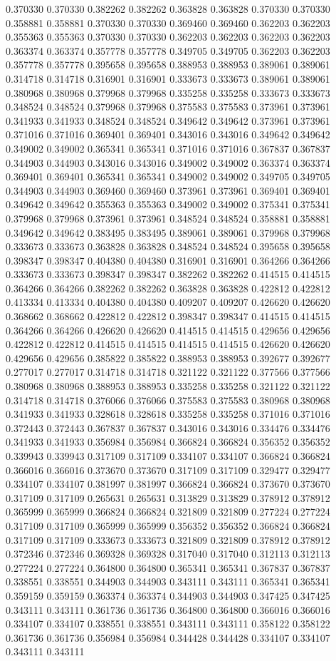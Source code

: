 0.370330 0.370330 0.382262 0.382262 0.363828 0.363828 0.370330 0.370330 0.358881 0.358881 0.370330 0.370330 0.369460 0.369460 0.362203 0.362203 0.355363 0.355363 0.370330 0.370330 0.362203 0.362203 0.362203 0.362203 0.363374 0.363374 0.357778 0.357778 0.349705 0.349705 0.362203 0.362203 0.357778 0.357778 0.395658 0.395658 0.388953 0.388953 0.389061 0.389061 0.314718 0.314718 0.316901 0.316901 0.333673 0.333673 0.389061 0.389061 0.380968 0.380968 0.379968 0.379968 0.335258 0.335258 0.333673 0.333673 0.348524 0.348524 0.379968 0.379968 0.375583 0.375583 0.373961 0.373961 0.341933 0.341933 0.348524 0.348524 0.349642 0.349642 0.373961 0.373961 0.371016 0.371016 0.369401 0.369401 0.343016 0.343016 0.349642 0.349642 0.349002 0.349002 0.365341 0.365341 0.371016 0.371016 0.367837 0.367837 0.344903 0.344903 0.343016 0.343016 0.349002 0.349002 0.363374 0.363374 0.369401 0.369401 0.365341 0.365341 0.349002 0.349002 0.349705 0.349705 0.344903 0.344903 0.369460 0.369460 0.373961 0.373961 0.369401 0.369401 0.349642 0.349642 0.355363 0.355363 0.349002 0.349002 0.375341 0.375341 0.379968 0.379968 0.373961 0.373961 0.348524 0.348524 0.358881 0.358881 0.349642 0.349642 0.383495 0.383495 0.389061 0.389061 0.379968 0.379968 0.333673 0.333673 0.363828 0.363828 0.348524 0.348524 0.395658 0.395658 0.398347 0.398347 0.404380 0.404380 0.316901 0.316901 0.364266 0.364266 0.333673 0.333673 0.398347 0.398347 0.382262 0.382262 0.414515 0.414515 0.364266 0.364266 0.382262 0.382262 0.363828 0.363828 0.422812 0.422812 0.413334 0.413334 0.404380 0.404380 0.409207 0.409207 0.426620 0.426620 0.368662 0.368662 0.422812 0.422812 0.398347 0.398347 0.414515 0.414515 0.364266 0.364266 0.426620 0.426620 0.414515 0.414515 0.429656 0.429656 0.422812 0.422812 0.414515 0.414515 0.414515 0.414515 0.426620 0.426620 0.429656 0.429656 0.385822 0.385822 0.388953 0.388953 0.392677 0.392677 0.277017 0.277017 0.314718 0.314718 0.321122 0.321122 0.377566 0.377566 0.380968 0.380968 0.388953 0.388953 0.335258 0.335258 0.321122 0.321122 0.314718 0.314718 0.376066 0.376066 0.375583 0.375583 0.380968 0.380968 0.341933 0.341933 0.328618 0.328618 0.335258 0.335258 0.371016 0.371016 0.372443 0.372443 0.367837 0.367837 0.343016 0.343016 0.334476 0.334476 0.341933 0.341933 0.356984 0.356984 0.366824 0.366824 0.356352 0.356352 0.339943 0.339943 0.317109 0.317109 0.334107 0.334107 0.366824 0.366824 0.366016 0.366016 0.373670 0.373670 0.317109 0.317109 0.329477 0.329477 0.334107 0.334107 0.381997 0.381997 0.366824 0.366824 0.373670 0.373670 0.317109 0.317109 0.265631 0.265631 0.313829 0.313829 0.378912 0.378912 0.365999 0.365999 0.366824 0.366824 0.321809 0.321809 0.277224 0.277224 0.317109 0.317109 0.365999 0.365999 0.356352 0.356352 0.366824 0.366824 0.317109 0.317109 0.333673 0.333673 0.321809 0.321809 0.378912 0.378912 0.372346 0.372346 0.369328 0.369328 0.317040 0.317040 0.312113 0.312113 0.277224 0.277224 0.364800 0.364800 0.365341 0.365341 0.367837 0.367837 0.338551 0.338551 0.344903 0.344903 0.343111 0.343111 0.365341 0.365341 0.359159 0.359159 0.363374 0.363374 0.344903 0.344903 0.347425 0.347425 0.343111 0.343111 0.361736 0.361736 0.364800 0.364800 0.366016 0.366016 0.334107 0.334107 0.338551 0.338551 0.343111 0.343111 0.358122 0.358122 0.361736 0.361736 0.356984 0.356984 0.344428 0.344428 0.334107 0.334107 0.343111 0.343111 